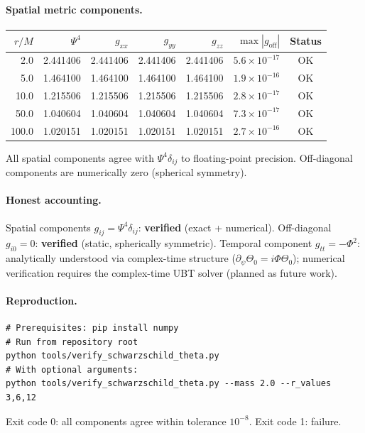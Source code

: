 \documentclass[12pt,a4paper]{article}
\theoremstyle{definition}
\theoremstyle{remark}
\begin{document}
\paragraph{Spatial metric components.}

\begin{center}
\begin{tabular}{rrrrrrc}
\toprule
$r/M$ & $\Psi^4$ & $g_{xx}$ & $g_{yy}$ & $g_{zz}$ & $\max|g_\mathrm{off}|$ & Status \\
\midrule
2.0   & 2.441406 & 2.441406 & 2.441406 & 2.441406 & $5.6\times10^{-17}$ & OK \\
5.0   & 1.464100 & 1.464100 & 1.464100 & 1.464100 & $1.9\times10^{-16}$ & OK \\
10.0  & 1.215506 & 1.215506 & 1.215506 & 1.215506 & $2.8\times10^{-17}$ & OK \\
50.0  & 1.040604 & 1.040604 & 1.040604 & 1.040604 & $7.3\times10^{-17}$ & OK \\
100.0 & 1.020151 & 1.020151 & 1.020151 & 1.020151 & $2.7\times10^{-16}$ & OK \\
\bottomrule
\end{tabular}
\end{center}

All spatial components agree with $\Psi^4\delta_{ij}$ to floating-point precision.
Off-diagonal components are numerically zero (spherical symmetry).

\paragraph{Honest accounting.}
Spatial components $g_{ij} = \Psi^4\delta_{ij}$: \textbf{verified} (exact + numerical).
Off-diagonal $g_{i0} = 0$: \textbf{verified} (static, spherically symmetric).
Temporal component $g_{tt} = -\Phi^2$: analytically understood via complex-time
structure ($\partial_\psi\Theta_0 = i\Phi\Theta_0$); numerical verification
requires the complex-time UBT solver (planned as future work).

\paragraph{Reproduction.}
\begin{verbatim}
# Prerequisites: pip install numpy
# Run from repository root
python tools/verify_schwarzschild_theta.py
# With optional arguments:
python tools/verify_schwarzschild_theta.py --mass 2.0 --r_values 3,6,12
\end{verbatim}
Exit code 0: all components agree within tolerance $10^{-8}$.
Exit code 1: failure.
\end{document}
